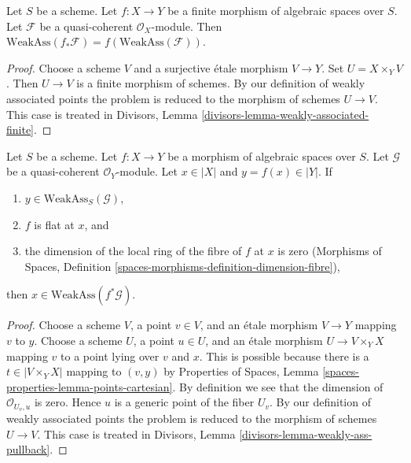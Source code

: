 \begin{lemma}
\label{lemma-weakly-associated-finite}
Let $S$ be a scheme.
Let $f : X \to Y$ be a finite morphism of algebraic spaces over $S$.
Let $\mathcal{F}$ be a quasi-coherent $\mathcal{O}_X$-module.
Then $\text{WeakAss}(f_*\mathcal{F}) = f(\text{WeakAss}(\mathcal{F}))$.
\end{lemma}

\begin{proof}
Choose a scheme $V$ and a surjective \'etale morphism $V \to Y$.
Set $U = X \times_Y V$. Then $U \to V$ is a finite morphism
of schemes. By our definition of weakly associated points
the problem is reduced to the morphism of schemes $U \to V$. This case is
treated in Divisors, Lemma \ref{divisors-lemma-weakly-associated-finite}.
\end{proof}

\begin{lemma}
\label{lemma-weakly-ass-pullback}
Let $S$ be a scheme. Let $f : X \to Y$ be a morphism of algebraic spaces
over $S$. Let $\mathcal{G}$ be a quasi-coherent $\mathcal{O}_Y$-module.
Let $x \in |X|$ and $y = f(x) \in |Y|$. If
\begin{enumerate}
\item $y \in \text{WeakAss}_S(\mathcal{G})$,
\item $f$ is flat at $x$, and
\item the dimension of the local ring of the fibre of $f$ at $x$
is zero (Morphisms of Spaces, Definition
\ref{spaces-morphisms-definition-dimension-fibre}),
\end{enumerate}
then $x \in \text{WeakAss}(f^*\mathcal{G})$.
\end{lemma}

\begin{proof}
Choose a scheme $V$, a point $v \in V$, and an \'etale morphism $V \to Y$
mapping $v$ to $y$. Choose a scheme $U$, a point $u \in U$, and an
\'etale morphism $U \to V \times_Y X$ mapping $v$ to a point lying over
$v$ and $x$. This is possible because there is a $t \in |V \times_Y X|$
mapping to $(v, y)$ by Properties of Spaces, Lemma
\ref{spaces-properties-lemma-points-cartesian}.
By definition we see that the dimension of $\mathcal{O}_{U_v, u}$ is zero.
Hence $u$ is a generic point of the fiber $U_v$.
By our definition of weakly associated points
the problem is reduced to the morphism of schemes $U \to V$.
This case is treated in
Divisors, Lemma \ref{divisors-lemma-weakly-ass-pullback}.
\end{proof}

